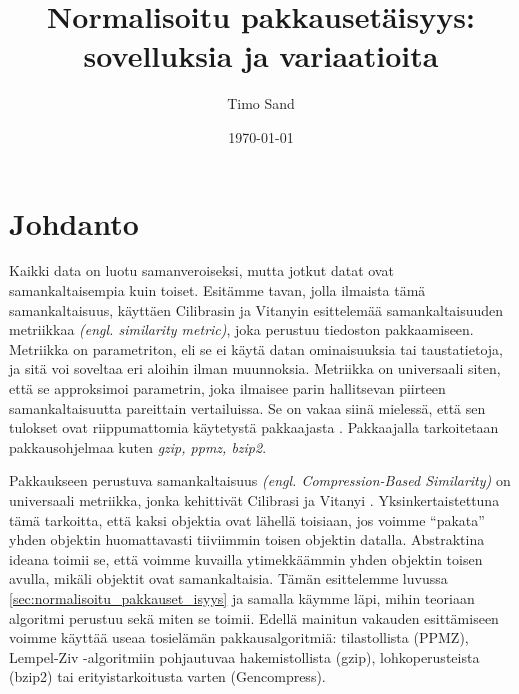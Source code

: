 \documentclass[12pt,finnish]{tktltiki2}
\title{Normalisoitu pakkausetäisyys: sovelluksia ja variaatioita}
\author{Timo Sand}
\date{\today}
\theoremstyle{definition}
\theoremstyle{remark}
\newcommand{\engl}[1]{\emph{(engl. #1)}}
\begin{document}

\frontmatter      %

\maketitle        %
\makeabstract     %

\tableofcontents  %


\mainmatter       %

\section{Johdanto} %
\label{sec:johdanto}

\label{par:intro-1}
  Kaikki data on luotu samanveroiseksi, mutta jotkut datat ovat samankaltaisempia kuin toiset.
  Esitämme tavan, jolla ilmaista tämä samankaltaisuus, käyttäen Cilibrasin ja Vitanyin esittelemää samankaltaisuuden metriikkaa \engl{similarity metric}, joka perustuu tiedoston pakkaamiseen. \cite{CV05}
  Metriikka on parametriton, eli se ei käytä datan ominaisuuksia tai taustatietoja, ja sitä voi soveltaa eri aloihin ilman muunnoksia.
  Metriikka on universaali siten, että se approksimoi parametrin, joka ilmaisee parin hallitsevan piirteen samankaltaisuutta pareittain vertailuissa.
  Se on vakaa siinä mielessä, että sen tulokset ovat riippumattomia käytetystä pakkaajasta \cite{CV05}. Pakkaajalla tarkoitetaan pakkausohjelmaa kuten \emph{gzip, ppmz, bzip2}.

  \label{par:intro-2}
  Pakkaukseen perustuva samankaltaisuus \engl{Compression-Based Similarity} on universaali metriikka, jonka kehittivät Cilibrasi ja Vitanyi \cite{CV05}.
  Yksinkertaistettuna tämä tarkoitta, että kaksi objektia ovat lähellä toisiaan, jos voimme ``pakata'' yhden objektin huomattavasti tiiviimmin toisen objektin datalla.
  Abstraktina ideana toimii se, että voimme kuvailla ytimekkäämmin yhden objektin toisen avulla, mikäli objektit ovat samankaltaisia.
  Tämän esittelemme luvussa \ref{sec:normalisoitu_pakkauset_isyys} ja samalla käymme läpi, mihin teoriaan algoritmi perustuu sekä miten se toimii.
  Edellä mainitun vakauden esittämiseen voimme käyttää useaa tosielämän pakkausalgoritmiä: tilastollista (PPMZ), Lempel-Ziv -algoritmiin pohjautuvaa hakemistollista (gzip), lohkoperusteista (bzip2) tai erityistarkoitusta varten (Gencompress).
\end{document}
